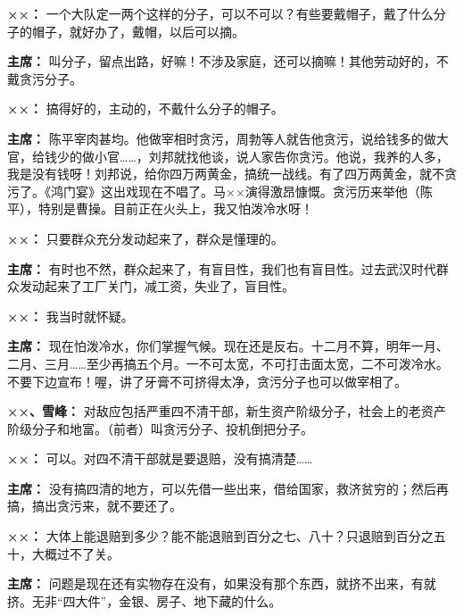 \begin{list}{}
\item[\textbf{××：}] 一个大队定一两个这样的分子，可以不可以？有些要戴帽子，戴了什么分子的帽子，就好办了，戴帽，以后可以摘。

\item[\textbf{主席：}] 叫分子，留点出路，好嘛！不涉及家庭，还可以摘嘛！其他劳动好的，不戴贪污分子。

\item[\textbf{××：}] 搞得好的，主动的，不戴什么分子的帽子。

\item[\textbf{主席：}] 陈平宰肉甚均。他做宰相时贪污，周勃等人就告他贪污，说给钱多的做大官，给钱少的做小官……，刘邦就找他谈，说人家告你贪污。他说，我养的人多，我是没有钱呀！刘邦说，给你四万两黄金，搞统一战线。有了四万两黄金，就不贪污了。《鸿门宴》这出戏现在不唱了。马××演得激昂慷慨。贪污历来举他（陈平），特别是曹操。目前正在火头上，我又怕泼冷水呀！

\item[\textbf{××：}] 只要群众充分发动起来了，群众是懂理的。

\item[\textbf{主席：}] 有时也不然，群众起来了，有盲目性，我们也有盲目性。过去武汉时代群众发动起来了工厂关门，减工资，失业了，盲目性。

\item[\textbf{××：}] 我当时就怀疑。

\item[\textbf{主席：}] 现在怕泼冷水，你们掌握气候。现在还是反右。十二月不算，明年一月、二月、三月……至少再搞五个月。一不可太宽，不可打击面太宽，二不可泼冷水。不要下边宣布！喔，讲了牙膏不可挤得太净，贪污分子也可以做宰相了。

\item[\textbf{××、雪峰：}] 对敌应包括严重四不清干部，新生资产阶级分子，社会上的老资产阶级分子和地富。（前者）叫贪污分子、投机倒把分子。

\item[\textbf{××：}] 可以。对四不清干部就是要退赔，没有搞清楚……

\item[\textbf{主席：}] 没有搞四清的地方，可以先借一些出来，借给国家，救济贫穷的；然后再搞，搞出贪污来，就不要还了。

\item[\textbf{××：}] 大体上能退赔到多少？能不能退赔到百分之七、八十？只退赔到百分之五十，大概过不了关。

\item[\textbf{主席：}] 问题是现在还有实物存在没有，如果没有那个东西，就挤不出来，有就挤。无非“四大件”，金银、房子、地下藏的什么。


\end{list}
